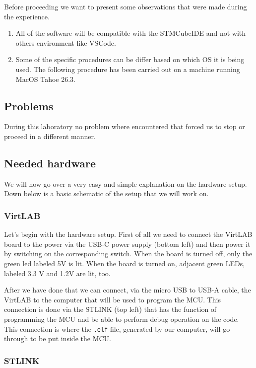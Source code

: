 \documentclass[../main.tex]{subfiles}
\begin{document}
Before proceeding we want to present some observations that were made during the experience.

\begin{enumerate}[label=\textbf{-}]
	\item All of the software will be compatible with the STMCubeIDE and not with others environment like VSCode.
	\item Some of the specific procedures can be differ based on which OS it is being used. The following procedure has been carried out on a machine running MacOS Tahoe 26.3.
\end{enumerate}

\subsection*{Problems}


During this laboratory no problem where encountered that forced us to stop or proceed in a different manner.


\subsection{Needed hardware}

We will now go over a very easy and simple explanation on the hardware setup.
Down below is a basic schematic of the setup that we will work on.

\subsubsection*{VirtLAB}

Let's begin with the hardware setup. First of all we need to connect the VirtLAB board to the power via the USB-C power supply (bottom left) and then power it by switching on the corresponding switch. When the board is turned off, only the green led labeled 5V is lit. When the board is turned on, adjacent green LEDs, labeled 3.3 V and 1.2V are lit, too.

After we have done that we can connect, via the micro USB to USB-A cable, the VirtLAB to the computer that will be used to program the MCU.
This connection is done via the STLINK (top left) that has the function of programming the MCU and be able to perform debug operation on the code.
This connection is where the \texttt{.elf} file, generated by our computer, will go through to be put inside the MCU.\\


\subsubsection*{STLINK}
\end{document}
